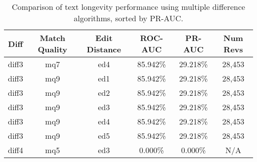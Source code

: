 \begin{table}[tbph]
\begin{center}
\begin{tabular}{|c|c|c||c|c|c|}
\hline
Diff & Match Quality & Edit Distance & ROC-AUC & PR-AUC & Num Revs \\
\hline
\hline
diff3 & mq7 & ed4 & 85.942\% & 29.218\% & 28,453 \\
diff3 & mq9 & ed1 & 85.942\% & 29.218\% & 28,453 \\
diff3 & mq9 & ed2 & 85.942\% & 29.218\% & 28,453 \\
diff3 & mq9 & ed3 & 85.942\% & 29.218\% & 28,453 \\
diff3 & mq9 & ed4 & 85.942\% & 29.218\% & 28,453 \\
diff3 & mq9 & ed5 & 85.942\% & 29.218\% & 28,453 \\
diff4 & mq5 & ed3 & 0.000\% & 0.000\% & N/A \\
\hline
\end{tabular}
\end{center}
\caption{Comparison of text longevity performance using
    multiple difference algorithms, sorted by PR-AUC.}
\label{tab:textshout}
\end{table}
